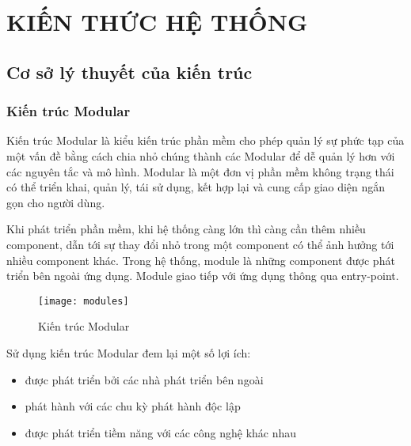 \chapter{KIẾN THỨC HỆ THỐNG}

\section{Cơ sở lý thuyết của kiến trúc}

\subsection{Kiến trúc Modular}

Kiến trúc Modular là kiểu kiến trúc phần mềm cho phép quản lý sự phức tạp của một vấn đề bằng cách chia nhỏ chúng thành các Modular để dễ quản lý hơn với các nguyên tắc và mô hình. Modular là một đơn vị phần mềm không trạng thái có thể triển khai, quản lý, tái sử dụng, kết hợp lại và cung cấp giao diện ngắn gọn cho người dùng.

Khi phát triển phần mềm, khi hệ thống càng lớn thì càng cần thêm nhiều component, dẫn tới sự thay đổi nhỏ trong một component có thể ảnh hưởng tới nhiều component khác. Trong hệ thống, module là những component được phát triển bên ngoài ứng dụng. Module giao tiếp với ứng dụng thông qua entry-point.

\begin{figure}[H]
	\centering
	\texttt{[image: modules]}
	\caption{Kiến trúc Modular}
\end{figure}

Sử dụng kiến trúc Modular đem lại một số lợi ích:

\begin{itemize}
	\begin{itemize}
		\item được phát triển bởi các nhà phát triển bên ngoài
		\item phát hành với các chu kỳ phát hành độc lập
		\item được phát triển tiềm năng với các công nghệ khác nhau
	\end{itemize}
\end{itemize}

